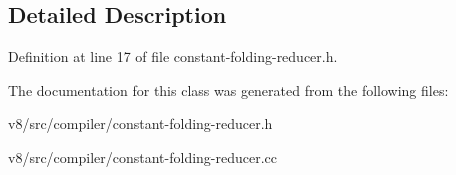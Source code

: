 \subsection{Detailed Description}


Definition at line 17 of file constant-\/folding-\/reducer.\+h.



The documentation for this class was generated from the following files\+:\begin{DoxyCompactItemize}
\item 
v8/src/compiler/constant-\/folding-\/reducer.\+h\item 
v8/src/compiler/constant-\/folding-\/reducer.\+cc\end{DoxyCompactItemize}
